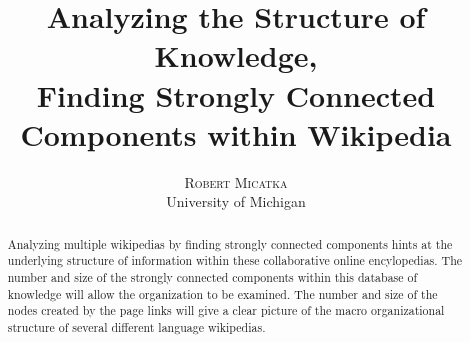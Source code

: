 \documentclass[twoside]{article}
\title{\vspace{-15mm}\fontsize{14pt}{12pt}\selectfont\textbf{Analyzing the Structure of Knowledge, \\Finding Strongly Connected Components within Wikipedia}} %
\author{
\large
\textsc{Robert Micatka}\\ %
\normalsize University of Michigan \\ %
}
\begin{document}
\maketitle 

\date{}


\begin{abstract}

	Analyzing multiple wikipedias by finding strongly connected components hints at 
	the underlying structure of information within these collaborative online encylopedias.
	The number and size of the strongly connected components within this database of knowledge 
	will allow the organization to be examined. The number and size of the nodes
	created by the page links will give a clear picture of the macro 
	organizational structure of several different language wikipedias.

 
\end{abstract}

\end{document}
